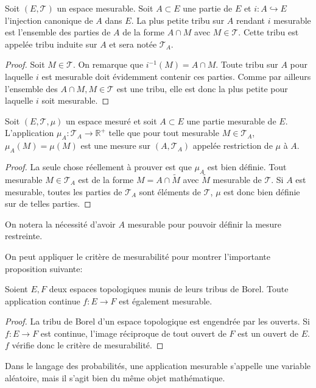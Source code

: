 \begin{mandatory}
\begin{prop}
Soit $(E, \mathcal{T})$ un espace mesurable. Soit $A \subset E$ une partie de
$E$ et $i \colon A \hookrightarrow E$ l'injection canonique de $A$ dans $E$. La
plus petite tribu sur $A$ rendant $i$ mesurable est l'ensemble des parties de
$A$ de la forme $A \cap M$ avec $M \in \mathcal{T}$. Cette tribu est appelée
tribu induite sur $A$ et sera notée $\mathcal{T}_A$.
\end{prop}
\end{mandatory}
\begin{proof}
Soit $M \in \mathcal{T}$. On remarque que $i^{-1}(M)=A \cap M$. Toute tribu sur
$A$ pour laquelle $i$ est mesurable doit évidemment contenir ces parties. Comme
par ailleurs l'ensemble des $A \cap M, M \in \mathcal{T}$ est une tribu, elle
est donc la plus petite pour laquelle $i$ soit mesurable.
\end{proof}
\begin{mandatory}
\begin{prop}
Soit $(E, \mathcal{T}, \mu)$ un espace mesuré et soit $A \subset E$ une partie
mesurable de $E$. L'application $\mu_A \colon \mathcal{T}_A \to \mathbb{R}^+$
telle que pour tout mesurable $M \in \mathcal{T}_A$, $\mu_A(M) = \mu(M)$ est une mesure
sur $(A, \mathcal{T}_A)$ appelée restriction de $\mu$ à $A$.
\end{prop}
\end{mandatory}
\begin{proof}
La seule chose réellement à prouver est que $\mu_A$ est bien définie. Tout
mesurable $M \in \mathcal{T}_A$ est de la forme $M=A \cap \tilde{M}$ avec $\tilde{M}$ mesurable de $\mathcal{T}$. Si $A$ est
mesurable, toutes les parties de $\mathcal{T}_A$ sont éléments de $\mathcal{T}$,
$\mu$ est donc bien définie sur de telles parties.
\end{proof}
On notera la nécessité d'avoir $A$ mesurable pour pouvoir définir la mesure
restreinte.

On peut appliquer le critère de mesurabilité pour montrer l'importante
proposition suivante:
\begin{mandatory}
\begin{prop}
Soient $E,F$ deux espaces topologiques munis de leurs tribus de Borel. Toute
application continue $f \colon E \to F$ est également mesurable.
\end{prop}
\end{mandatory}
\begin{proof}
La tribu de Borel d'un espace topologique est engendrée par les ouverts. Si $f
\colon E \to F$ est continue, l'image réciproque de tout ouvert de $F$ est un
ouvert de $E$. $f$ vérifie donc le critère de mesurabilité.
\end{proof}
\begin{rem}
Dans le langage des probabilités, une application mesurable
s'appelle une variable aléatoire, mais il s'agit bien du même objet
mathématique.
\end{rem}

